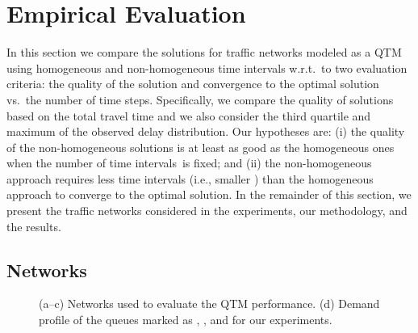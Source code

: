 \section{Empirical Evaluation}
  
In this section we compare the solutions for traffic networks modeled as a QTM
using homogeneous and non-homogeneous time intervals w.r.t.\ to two evaluation criteria:
%
the quality of the solution and convergence to the optimal solution vs.\ the number
of time steps.
%
%
Specifically, we compare the quality of solutions based on the total travel time and we also
consider the third quartile and maximum of the observed delay distribution.
%
%
%
Our hypotheses are:
%
(i) the quality of the non-homogeneous solutions is at least as good as the
homogeneous ones when the number of time intervals~\Nn is fixed; and 
%
(ii) the non-homogeneous approach requires less time intervals (i.e., smaller
\Nn) than the homogeneous approach to converge to the optimal solution.
%
In the remainder of this section, we present the traffic networks considered in
the experiments, our methodology, and the results.



\subsection{Networks}



\begin{figure*}[t!]
\centering
\caption{(a--c) Networks used to evaluate the QTM performance.
%
(d) Demand profile of the queues marked as \qLowTraf,
\qHighTraf, and \qVarTraf for our experiments.}
\label{fig:networks}
\end{figure*}



